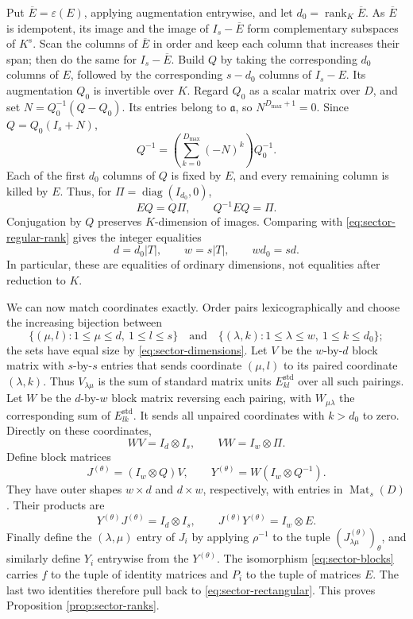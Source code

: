 Put $\overline E=\varepsilon(E)$, applying augmentation entrywise,
and let $d_0=\operatorname{rank}_K\overline E$.  As
$\overline E$ is idempotent, its image and the image of
$I_s-\overline E$ form complementary subspaces of $K^s$.
Scan the columns of $\overline E$ in order and keep each column that
increases their span; then do the same for $I_s-\overline E$.
Build $Q$ by taking the corresponding $d_0$ columns of $E$, followed
by the corresponding $s-d_0$ columns of $I_s-E$.  Its augmentation
$Q_0$ is invertible over $K$.  Regard $Q_0$ as a scalar matrix over
$D$, and set $N=Q_0^{-1}(Q-Q_0)$.  Its entries belong to
$\mathfrak a$, so $N^{D_{\max}+1}=0$.  Since $Q=Q_0(I_s+N)$,
\begin{equation}\label{eq:sector-Q-inverse}
 Q^{-1}=\left(\sum_{k=0}^{D_{\max}}(-N)^k\right)Q_0^{-1}.
\end{equation}
Each of the first $d_0$ columns of $Q$ is fixed by $E$, and every
remaining column is killed by $E$.  Thus, for
$\Pi=\operatorname{diag}(I_{d_0},0)$,
\[
 EQ=Q\Pi,\qquad Q^{-1}EQ=\Pi.
\]
Conjugation by $Q$ preserves $K$-dimension of images.  Comparing with
\eqref{eq:sector-regular-rank} gives the integer equalities
\begin{equation}\label{eq:sector-dimensions}
 d=d_0|T|,\qquad w=s|T|,\qquad wd_0=sd.
\end{equation}
In particular, these are equalities of ordinary dimensions, not
equalities after reduction to $K$.

We can now match coordinates exactly.  Order pairs lexicographically
and choose the increasing bijection between
\[
 \{(\mu,l):1\le\mu\le d,\ 1\le l\le s\}
 \quad\text{and}\quad
 \{(\lambda,k):1\le\lambda\le w,\ 1\le k\le d_0\};
\]
the sets have equal size by \eqref{eq:sector-dimensions}.
Let $V$ be the $w$-by-$d$ block matrix with $s$-by-$s$ entries
that sends coordinate $(\mu,l)$ to its paired coordinate
$(\lambda,k)$.  Thus $V_{\lambda\mu}$ is the sum of standard
matrix units $E_{kl}^{\mathrm{std}}$ over all such pairings.
Let $W$ be the $d$-by-$w$ block matrix reversing each pairing, with
$W_{\mu\lambda}$ the corresponding sum of
$E_{lk}^{\mathrm{std}}$.  It sends all unpaired coordinates with
$k>d_0$ to zero.  Directly on these coordinates,
\[
 WV=I_d\otimes I_s,\qquad VW=I_w\otimes\Pi.
\]
Define block matrices
\[
 J^{(\theta)}=(I_w\otimes Q)V,\qquad
 Y^{(\theta)}=W(I_w\otimes Q^{-1}).
\]
They have outer shapes $w\times d$ and $d\times w$, respectively,
with entries in $\operatorname{Mat}_s(D)$.  Their products are
\[
 Y^{(\theta)}J^{(\theta)}=I_d\otimes I_s,\qquad
 J^{(\theta)}Y^{(\theta)}=I_w\otimes E.
\]
Finally define the $(\lambda,\mu)$ entry of $J_i$ by applying
$\rho^{-1}$ to the tuple
$(J^{(\theta)}_{\lambda\mu})_\theta$, and similarly define $Y_i$
entrywise from the $Y^{(\theta)}$.  The isomorphism
\eqref{eq:sector-blocks} carries $f$ to the tuple of identity
matrices and $P_i$ to the tuple of matrices $E$.  The last two
identities therefore pull back to
\eqref{eq:sector-rectangular}.  This proves Proposition
\ref{prop:sector-ranks}.

